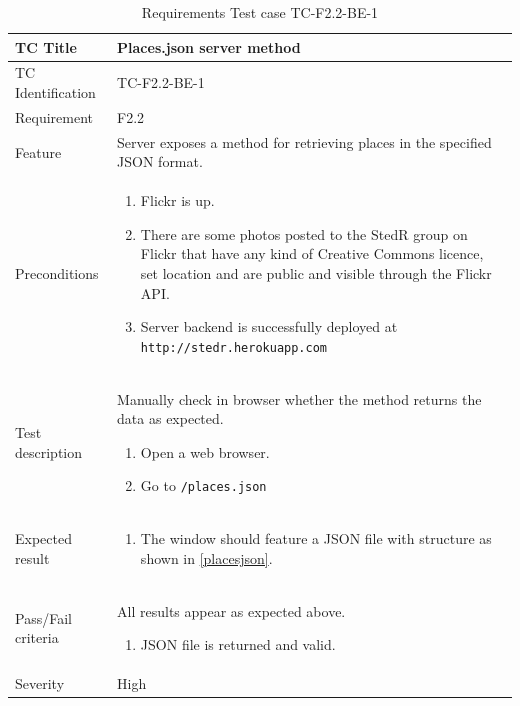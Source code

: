 \documentclass[11pt]{book}
\begin{document}
\begin{table}
  \begin{tabular}{| p{3cm} | p{9.5cm} |} \hline 
    TC Title              & Places.json server method \\ \hline 
    TC Identification     & TC-F2.2-BE-1 \\ \hline 
    Requirement           & F2.2 \\ \hline 
    Feature               & Server exposes a method for retrieving places in the specified JSON format. \\ \hline 
    Preconditions         & \begin{enumerate}
                              \item Flickr is up.
                              \item There are some photos posted to the StedR group on Flickr that have any kind of
                               Creative Commons licence, set location and are public and visible through the Flickr API.
                              \item Server backend is successfully deployed at \texttt{http://stedr.herokuapp.com}
                            \end{enumerate} \\ \hline 

    Test description      & Manually check in browser whether the method returns the data as expected.

                            \begin{enumerate}
                              \item Open a web browser.
                              \item Go to \texttt{/places.json}
                            \end{enumerate} \\ \hline 
    Expected result       & \begin{enumerate}
                              \item The window should feature a JSON file with structure as shown in \ref{placesjson}.
                            \end{enumerate} \\ \hline 
    Pass/Fail criteria    & All results appear as expected above.
                            \begin{enumerate}
                              \item JSON file is returned and valid.
                            \end{enumerate} \\ \hline 
    Severity              & High \\ \hline 
  \end{tabular}
  \caption{Requirements Test case TC-F2.2-BE-1}
  \label{tab:TCF2.2BE1}
\end{table}
\end{document}
